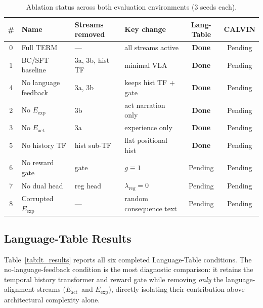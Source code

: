 \documentclass{article}
\renewcommand{\arraystretch}{1.25}
\newcommand{\modelname}{\textsc{TERM}\xspace}
\newcommand{\Lact}{$E_{\mathrm{act}}$\xspace}
\newcommand{\Lexp}{$E_{\mathrm{exp}}$\xspace}
\begin{document}
\begin{table}[h]
\centering
\caption{Ablation status across both evaluation environments (3 seeds each).}
\label{tab:ablation_status}
\small
\renewcommand{\arraystretch}{1.15}
\begin{tabular}{clllcc}
\toprule
\textbf{\#} & \textbf{Name} & \textbf{Streams removed} & \textbf{Key change}
            & \textbf{Lang-Table} & \textbf{CALVIN} \\
\midrule
0 & Full \modelname        & —                  & all streams active    & \textbf{Done} & Pending \\
1 & BC/SFT baseline        & 3a, 3b, hist TF    & minimal VLA           & \textbf{Done} & Pending \\
4 & No language feedback   & 3a, 3b             & keeps hist TF + gate  & \textbf{Done} & Pending \\
2 & No \Lexp               & 3b                 & act narration only    & \textbf{Done} & Pending \\
3 & No \Lact               & 3a                 & experience only       & \textbf{Done} & Pending \\
5 & No history TF          & hist sub-TF        & flat positional hist  & \textbf{Done} & Pending \\
6 & No reward gate         & gate               & $g\!\equiv\!1$        & Pending & Pending \\
7 & No dual head           & reg head           & $\lambda_\mathrm{reg}{=}0$ & Pending & Pending \\
8 & Corrupted \Lexp        & —                  & random consequence text & Pending & Pending \\
\bottomrule
\end{tabular}
\end{table}

\subsection{Language-Table Results}
\label{sec:lt_results}

Table~\ref{tab:lt_results} reports all six completed Language-Table conditions.
The no-language-feedback condition is the most diagnostic comparison:
it retains the temporal history transformer and reward gate while removing
\emph{only} the language-alignment streams (\Lact\ and \Lexp), directly
isolating their contribution above architectural complexity alone.
\end{document}
